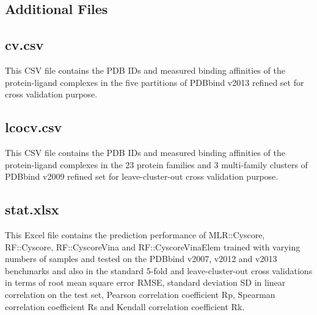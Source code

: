 \documentclass[twocolumn]{bmcart}
\begin{document}
\begin{backmatter}

\section*{Additional Files}

\subsection*{cv.csv}
This CSV file contains the PDB IDs and measured binding affinities of the protein-ligand complexes in the five partitions of PDBbind v2013 refined set for cross validation purpose.

\subsection*{lcocv.csv}
This CSV file contains the PDB IDs and measured binding affinities of the protein-ligand complexes in the 23 protein families and 3 multi-family clusters of PDBbind v2009 refined set for leave-cluster-out cross validation purpose.

\subsection*{stat.xlsx}
This Excel file contains the prediction performance of MLR::Cyscore, RF::Cyscore, RF::CyscoreVina and RF::CyscoreVinaElem trained with varying numbers of samples and tested on the PDBbind v2007, v2012 and v2013 benchmarks and also in the standard 5-fold and leave-cluster-out cross validations in terms of root mean square error RMSE, standard deviation SD in linear correlation on the test set, Pearson correlation coefficient Rp, Spearman correlation coefficient Rs and Kendall correlation coefficient Rk.

\end{backmatter}
\end{document}
